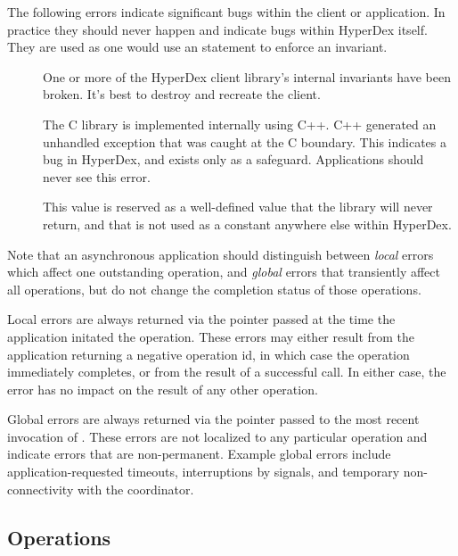 The following errors indicate significant bugs within the client or application.
In practice they should never happen and indicate bugs within HyperDex itself.
They are used as one would use an  statement to enforce an
invariant.

\begin{description}
\item[] One or more of the HyperDex client
    library's internal invariants have been broken.  It's best to destroy and
    recreate the client.
\item[] The C library is implemented
    internally using C++.  C++ generated an unhandled exception that was caught
    at the C boundary.  This indicates a bug in HyperDex, and exists only as a
    safeguard.  Applications should never see this error.
\item[] This value is reserved as a well-defined
    value that the library will never return, and that is not used as a constant
    anywhere else within HyperDex.
\end{description}

Note that an asynchronous application should distinguish between {\em local}
errors which affect one outstanding operation, and {\em global} errors that
transiently affect all operations, but do not change the completion status of
those operations.

Local errors are always returned via the  pointer passed at the time the application
initated the operation.  These errors may either result from the application
returning a negative operation id, in which case the operation immediately
completes, or from the result of a successful 
call.  In either case, the error has no impact on the result of any other
operation.

Global errors are always returned via the  pointer passed to the most recent invocation of
.  These errors are not localized to any particular
operation and indicate errors that are non-permanent.  Example global errors
include application-requested timeouts, interruptions by signals, and temporary
non-connectivity with the coordinator.

\subsection{Operations}
\label{sec:api:c:client:ops}

